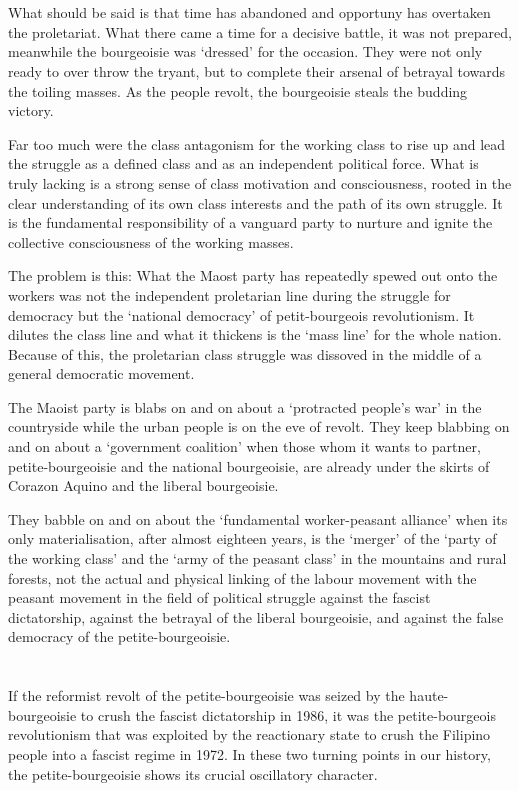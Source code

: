\section{}
What should be said is that
time has abandoned and opportuny has overtaken
the proletariat.
What there came a time for a decisive battle, 
it was not prepared,
meanwhile the bourgeoisie was `dressed' for the occasion.
They were not only ready to over throw the tryant,
but to complete their arsenal of betrayal towards the toiling masses.
As the people revolt, 
the bourgeoisie steals the budding victory.

Far too much 
were the class antagonism 
for the working class to rise up 
and lead the struggle as a defined class 
and as an independent political force. 
What is truly lacking 
is a strong sense of class motivation and consciousness, 
rooted in the clear understanding 
of its own class interests and the path of its own struggle. 
It is the fundamental responsibility of a vanguard party 
to nurture and ignite the collective consciousness 
of the working masses.

The problem is this:
What the Maost party 
has repeatedly spewed out onto the workers
was not the independent proletarian line 
during the struggle for democracy
but the `national democracy'
of petit-bourgeois revolutionism.
It dilutes the class line 
and what it thickens is the `mass line'
for the whole nation. 
Because of this, 
the proletarian class struggle was dissoved
in the middle of a general democratic movement.

The Maoist party is blabs on and on 
about a `protracted people's war' in the countryside 
while the urban people is on the eve of revolt. 
They keep blabbing on and on about a `government coalition'
when those whom it wants to partner, 
petite-bourgeoisie and the national bourgeoisie,
are already under the skirts of Corazon Aquino and the liberal bourgeoisie.


They babble on and on about the `fundamental worker-peasant alliance'
when its only materialisation,
after almost eighteen years, 
is the `merger' of the `party of the working class' 
and the `army of the peasant class' in the mountains and rural forests,
not the actual and physical linking 
of the labour movement with the peasant movement 
in the field of political struggle against the fascist dictatorship, 
against the betrayal of the liberal bourgeoisie, 
and against the false democracy of the petite-bourgeoisie.


\section{}
If the reformist revolt of the petite-bourgeoisie 
was seized by the haute-bourgeoisie
to crush the fascist dictatorship in 1986,
it was the petite-bourgeois revolutionism 
that was exploited
by the reactionary state 
to crush the Filipino people 
into a fascist regime in 1972.
In these two turning points in our history,
the petite-bourgeoisie shows its crucial oscillatory character.

